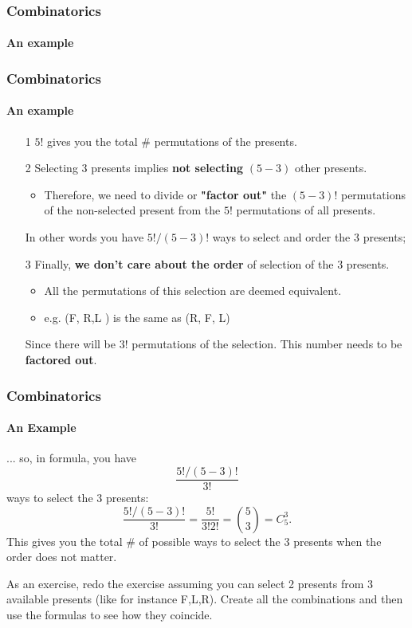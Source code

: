 \documentclass[notes=show, handout]{beamer}\usepackage[]{graphicx}\usepackage[]{color}
\begin{document}
\begin{frame}
\frametitle{Combinatorics}
\framesubtitle{An example}

\end{frame}


%
%
%
%

\begin{frame}
\frametitle{Combinatorics}
\framesubtitle{An example}
\begin{example}[Interpretation]
\begin{itemize}
\item[1] $5!$ gives you the total $\#$ permutations of the presents.
\item[2] Selecting $3$ presents implies \textbf{not selecting} $(5-3)$ other presents.
\begin{itemize}
\item Therefore, we need to divide or \textbf{"factor out"} the $(5-3)!$ permutations of the non-selected present  from the $5!$ permutations of all presents.
\end{itemize}
In other words you have $5! / (5-3) !$ ways to select and order the 3 presents;
\item[3] Finally, \textbf{we don't care about the order} of selection of the $3$ presents.
\begin{itemize}
\item All the permutations of this selection are deemed equivalent.
\item  e.g. (F, R,L ) is the same as (R, F, L)
\end{itemize}
Since there will be $3!$ permutations of the selection. This number needs to be \textbf{factored out}.
\end{itemize}
\end{example}

\end{frame}

\begin{frame}
\frametitle{Combinatorics}
\framesubtitle{An Example}
\begin{example}[continued]
... so, in formula, you have $$\frac{5!/(5-3)!}{3!}$$ ways to select the $3$ presents:
$$
\frac{5!/(5-3)!}{3!}= \frac{5!}{3!2!} = \binom 5 3 = C_5^3.
$$
This gives you the total $\#$ of possible ways to select the $3$ presents when the order does not matter.
\end{example}

As an exercise, redo the exercise assuming you can select 2 presents from 3 available presents
(like for instance F,L,R). Create all the combinations and then use the formulas to see how they coincide.

\end{frame}
\end{document}
